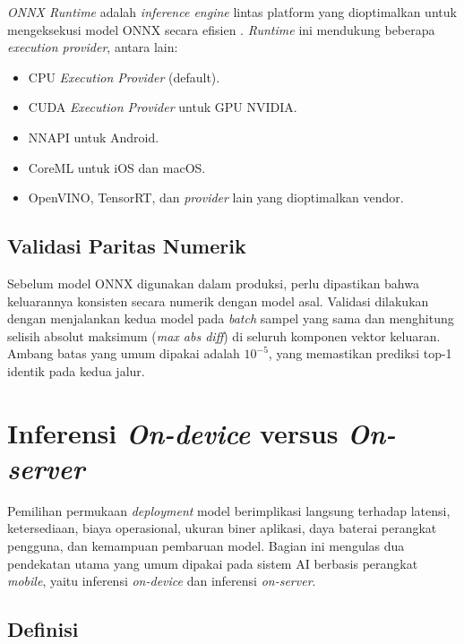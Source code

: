 \textit{ONNX Runtime} adalah \textit{inference engine} lintas platform yang dioptimalkan untuk mengeksekusi model ONNX secara efisien \citep{onnxruntime2024}. \textit{Runtime} ini mendukung beberapa \textit{execution provider}, antara lain:

\begin{itemize}
    \item CPU \textit{Execution Provider} (default).
    \item CUDA \textit{Execution Provider} untuk GPU NVIDIA.
    \item NNAPI untuk Android.
    \item CoreML untuk iOS dan macOS.
    \item OpenVINO, TensorRT, dan \textit{provider} lain yang dioptimalkan vendor.
\end{itemize}

\subsection{Validasi Paritas Numerik}

Sebelum model ONNX digunakan dalam produksi, perlu dipastikan bahwa keluarannya konsisten secara numerik dengan model asal. Validasi dilakukan dengan menjalankan kedua model pada \textit{batch} sampel yang sama dan menghitung selisih absolut maksimum (\textit{max abs diff}) di seluruh komponen vektor keluaran. Ambang batas yang umum dipakai adalah $10^{-5}$, yang memastikan prediksi top-1 identik pada kedua jalur.

\section{Inferensi \textit{On-device} versus \textit{On-server}}
\label{sec:on-device-vs-on-server}

Pemilihan permukaan \textit{deployment} model berimplikasi langsung terhadap latensi, ketersediaan, biaya operasional, ukuran biner aplikasi, daya baterai perangkat pengguna, dan kemampuan pembaruan model. Bagian ini mengulas dua pendekatan utama yang umum dipakai pada sistem AI berbasis perangkat \textit{mobile}, yaitu inferensi \textit{on-device} dan inferensi \textit{on-server}.

\subsection{Definisi}

